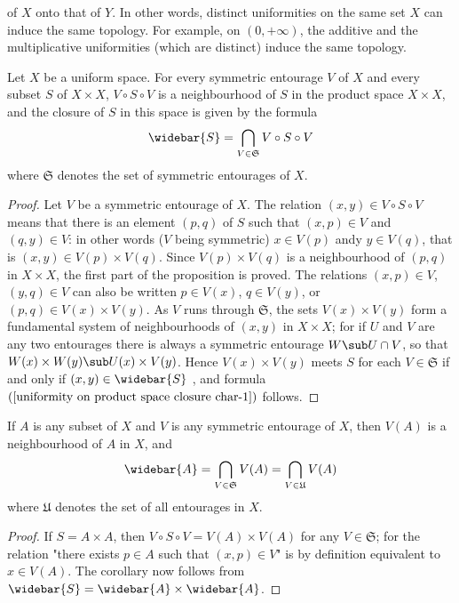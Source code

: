 of $X$ onto that of $Y$. In other words, distinct uniformities on the same set $X$ can induce the same topology. For example, on $(0,+\infty)$, the additive and the multiplicative uniformities (which are distinct) induce the same topology.
\begin{proposition}\label{uniformity on product space closure char}
Let $X$ be a uniform space. For every symmetric entourage $V$ of $X$ and every subset $S$ of $X\times X$, $V\circ S\circ V$ is a neighbourhood of $S$ in the product space $X\times X$, and the closure of $S$ in this space is given by the formula
\begin{align}\label{uniformity on product space closure char-1}
\widebar{S}=\bigcap_{V\in\mathfrak{S}}V\circ S\circ V
\end{align}
where $\mathfrak{S}$ denotes the set of symmetric entourages of $X$.
\end{proposition}
\begin{proof}
Let $V$ be a symmetric entourage of $X$. The relation $(x,y)\in V\circ S\circ V$ means that there is an element $(p,q)$ of $S$ such that $(x,p)\in V$ and $(q,y)\in V$: in other words ($V$ being symmetric) $x\in V(p)$ andy $y\in V(q)$, that is $(x,y)\in V(p)\times V(q)$. Since $V(p)\times V(q)$ is a neighbourhood of $(p,q)$ in $X\times X$, the first part of the proposition is proved. The relations $(x,p)\in V$, $(y,q)\in V$ can also be written $p\in V(x)$, $q\in V(y)$, or $(p,q)\in V(x)\times V(y)$. As $V$ runs through $\mathfrak{S}$, the sets $V(x)\times V(y)$ form a fundamental system of neighbourhoods of $(x,y)$ in $X\times X$; for if $U$ and $V$ are any two entourages there is always a symmetric entourage $W\sub U\cap V$, so that $W(x)\times W(y)\sub U(x)\times V(y)$. Hence $V(x)\times V(y)$ meets $S$ for each $V\in\mathfrak{S}$ if and only if $(x,y)\in\widebar{S}$ , and formula $(\ref{uniformity on product space closure char-1})$ follows.
\end{proof}
\begin{corollary}\label{uniformity topology closure char}
If $A$ is any subset of $X$ and $V$ is any symmetric entourage of $X$, then $V(A)$ is a neighbourhood of $A$ in $X$, and
\begin{align}\label{uniformity topology closure char-1}
\widebar{A}=\bigcap_{V\in\mathfrak{S}}V(A)=\bigcap_{V\in\mathfrak{U}}V(A)
\end{align}
where $\mathfrak{U}$ denotes the set of all entourages in $X$.
\end{corollary}
\begin{proof}
If $S=A\times A$, then $V\circ S\circ V=V(A)\times V(A)$ for any $V\in\mathfrak{S}$; for the relation "there exists $p\in A$ such that $(x,p)\in V$" is by definition equivalent to $x\in V(A)$. The corollary now follows from $\widebar{S}=\widebar{A}\times\widebar{A}$.
\end{proof}
